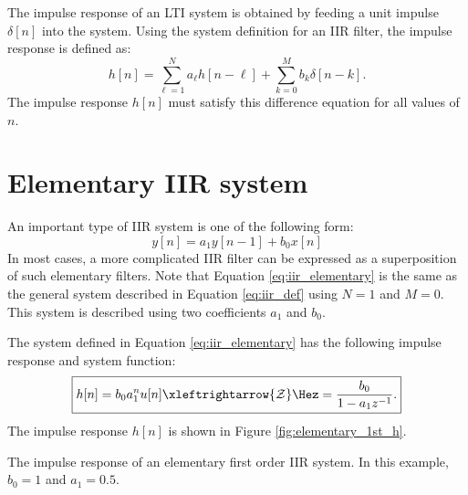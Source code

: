 The impulse response of an LTI system is obtained by feeding a unit
impulse $\delta[n]$ into the system. Using the system definition for
an IIR filter, the impulse response is defined as:
\begin{equation}
h[n] = \sum_{\ell=1}^{N} a_\ell h[n-\ell] + \sum_{k=0}^{M} b_k \delta[n-k].
\end{equation}
The impulse response $h[n]$ must satisfy this difference equation for
all values of $n$.

\section{Elementary IIR system}

An important type of IIR system is one of the following form:
\begin{equation}
y[n] = a_1 y[n-1] + b_0 x[n]
\label{eq:iir_elementary}
\end{equation}
In most cases, a more complicated IIR filter can be expressed as a
superposition of such elementary filters. Note that
Equation \ref{eq:iir_elementary} is the same as the general system
described in Equation \ref{eq:iir_def} using $N=1$ and $M=0$. This
system is described using two coefficients $a_1$ and $b_0$.

The system defined in Equation \ref{eq:iir_elementary} has the
following impulse response and system function:
\begin{equation}
\boxed{
h[n] = b_0 a_1^n u[n] \xleftrightarrow{\mathcal{Z}} \Hez = \frac{b_0}{1-a_1 z^{-1}}.
}
\end{equation}
The impulse response $h[n]$ is shown in Figure \ref{fig:elementary_1st_h}.
\begin{marginfigure}
\begin{center}
\end{center}
\caption{The impulse response of an elementary first order IIR system. In this example, $b_0=1$ and $a_1=0.5$.}
\label{fig:elementary_1st_h}
\end{marginfigure}

